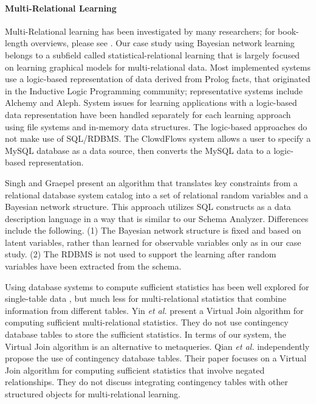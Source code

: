 \documentclass{acm_proc_article-sp}
\begin{document}
\paragraph{Multi-Relational Learning} 
Multi-Relational learning has been investigated by many researchers; for book-length overviews, please see \cite{SRL2007,Domingos2009,Dzeroski2001c,sun2012mining}.
Our case study using Bayesian network learning belongs to a subfield called statistical-relational learning that is largely focused on learning graphical models for multi-relational data. Most implemented systems use a logic-based representation of data derived from Prolog facts, that originated in the Inductive Logic Programming community; representative systems include Alchemy \cite{Kok2009a} and Aleph.
 System issues for learning applications with a logic-based data representation have been handled separately for each learning approach using file systems and in-memory data structures. The logic-based approaches do not make use of SQL/RDBMS. The ClowdFlows system \cite{Lavravc2014} allows a user to specify a MySQL database as a data source, then converts the MySQL data to a logic-based representation. 

Singh and Graepel \cite{Graepel_CIKM13} present an algorithm that translates key constraints from a relational database system catalog into a set of relational random variables and a Bayesian network structure. This approach utilizes SQL constructs as a data description language in a way that is similar to our Schema Analyzer. Differences include the following. (1) The Bayesian network structure is fixed and based on latent variables, rather than learned for observable variables only as in our case study. (2) The RDBMS is not used to support the learning after random variables have been extracted from the schema. 

Using database systems to compute sufficient statistics has been well explored for single-table data \cite{Moore1998,Graefe1998}, but much less for multi-relational statistics that combine information from different tables.
Yin {\em et al.} \cite{Yin2004} present a Virtual Join algorithm for computing sufficient multi-relational statistics. They do not use contingency database tables to store the sufficient statistics. In terms of our system, the Virtual Join algorithm is an alternative to metaqueries. Qian {\em et al.} \cite{Qian2014} independently propose the use of contingency database tables. Their paper focuses on a Virtual Join algorithm for computing sufficient statistics that involve negated relationships. They do not discuss integrating contingency tables with other structured objects for multi-relational learning. 
\end{document}
